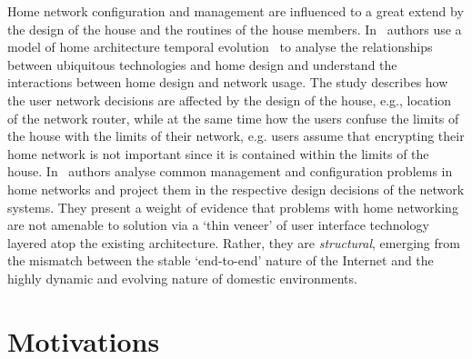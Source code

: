 Home network configuration and management are influenced to a great extend by
the design of the house and the routines of the house members.
In~\cite{Rodden03} authors use a model of home architecture temporal
evolution~\cite{Brand94} to analyse the relationships between ubiquitous
technologies and home design and understand the interactions between home design
and network usage. The study describes how the user network decisions are
affected by the design of the house, e.g., location of the network router, while
at the same time how the users confuse the limits of the house with the limits
of their network, e.g.  users assume that encrypting their home network is not
important since it is contained within the limits of the house.
In~\cite{shehan07} authors analyse common management and configuration problems
in home networks and project them in the respective design decisions of the
network systems.  They present a weight of evidence that problems with home
networking are not amenable to solution via a `thin veneer' of user interface
technology layered atop the existing architecture.  Rather, they are
\emph{structural}, emerging from the mismatch between the stable `end-to-end'
nature of the Internet and the highly dynamic and evolving nature of domestic
environments.  



\section{Motivations}\label{s:evolution}

